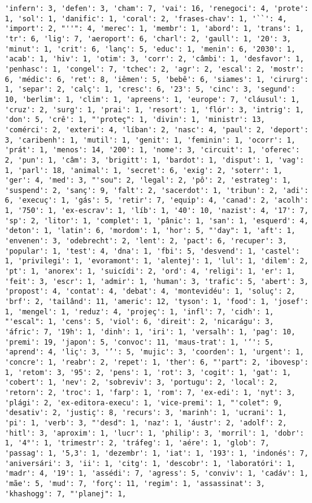\documentclass[11pt]{article}
\begin{document}
\begin{Verbatim}[commandchars=\\\{\}]
'infern': 3, 'defen': 3, 'cham': 7, 'vai': 16, 'renegoci': 4, 'prote': 1, 'sol': 1, 'danific': 1, 'coral': 2, 'frases-chav': 1, '``': 4, 'import': 2, "''": 4, 'merec': 1, 'membr': 1, 'abord': 1, 'trans': 1, 'tr': 6, 'lig': 7, 'aeroport': 6, 'charl': 2, 'gaull': 1, '20': 3, 'minut': 1, 'crit': 6, 'lanç': 5, 'educ': 1, 'menin': 6, '2030': 1, 'acab': 1, 'hiv': 1, 'otim': 3, 'corr': 2, 'câmbi': 1, 'desfavor': 1, 'penhasc': 1, 'congel': 7, 'tchec': 2, 'agr': 2, 'escal': 2, 'mostr': 6, 'médic': 6, 'ret': 8, 'iêmen': 5, 'bebê': 6, 'siames': 1, 'cirurg': 1, 'separ': 2, 'calç': 1, 'cresc': 6, '23': 5, 'cinc': 3, 'segund': 10, 'berlim': 1, 'clim': 1, 'apreens': 1, 'europe': 7, 'cláusul': 1, 'cruz': 2, 'surg': 1, 'prai': 1, 'resort': 1, 'flór': 3, 'intrig': 1, 'don': 5, 'crê': 1, "'proteç": 1, 'divin': 1, 'ministr': 13, 'comérci': 2, 'exteri': 4, 'líban': 2, 'nasc': 4, 'paul': 2, 'deport': 3, 'caribenh': 1, 'mutil': 1, 'genit': 1, 'feminin': 1, 'ocorr': 1, 'prát': 1, 'menos': 14, '200': 1, 'nome': 3, 'circuit': 1, 'oferec': 2, 'pun': 1, 'câm': 3, 'brigitt': 1, 'bardot': 1, 'disput': 1, 'vag': 1, 'parl': 18, 'animal': 1, 'secret': 6, 'exig': 2, 'soterr': 1, 'ger': 4, 'med': 3, "'sou": 2, 'legal': 2, 'pô': 2, 'estrateg': 1, 'suspend': 2, 'sanç': 9, 'falt': 2, 'sacerdot': 1, 'tribun': 2, 'adi': 6, 'execuç': 1, 'gás': 5, 'retir': 7, 'equip': 4, 'canad': 2, 'acolh': 1, '750': 1, 'ex-escrav': 1, 'líb': 1, '40': 10, 'nazist': 4, '17': 7, 'sp': 2, 'litor': 1, 'complet': 1, 'pânic': 1, 'san': 1, 'esquerd': 4, 'deton': 1, 'latin': 6, 'mordom': 1, 'hor': 5, "'day": 1, 'aft': 1, 'envenen': 3, 'odebrecht': 2, 'lent': 2, 'pact': 6, 'recuper': 3, 'popular': 1, 'test': 4, 'dna': 1, 'fbi': 5, 'desvend': 1, 'castel': 1, 'privilegi': 1, 'evoramont': 1, 'alentej': 1, 'lul': 1, 'dilem': 2, 'pt': 1, 'anorex': 1, 'suicídi': 2, 'ord': 4, 'religi': 1, 'er': 1, 'feit': 3, 'escr': 1, 'admir': 1, 'human': 3, 'trafic': 5, 'abert': 3, 'propost': 4, 'contat': 4, 'debat': 4, 'montevidéu': 1, 'soluç': 2, 'brf': 2, 'tailând': 11, 'americ': 12, 'tyson': 1, 'food': 1, 'josef': 1, 'mengel': 1, 'reduz': 4, 'projeç': 1, 'infl': 7, 'cidh': 1, "'escal": 1, 'cens': 5, 'viol': 6, 'direit': 2, 'nicarágu': 3, 'áfric': 7, '19h': 1, 'dinh': 1, 'iri': 1, 'versalh': 1, 'pag': 10, 'premi': 19, 'japon': 5, 'convoc': 11, 'maus-trat': 1, '‘': 5, 'aprend': 4, 'liç': 3, '’': 5, 'mujic': 3, 'coorden': 1, 'urgent': 1, 'concre': 1, 'reabr': 2, 'repet': 1, 'ther': 6, "'part": 2, 'ibovesp': 1, 'retom': 3, '95': 2, 'pens': 1, 'rot': 3, 'cogit': 1, 'gat': 1, 'cobert': 1, 'nev': 2, 'sobreviv': 3, 'portugu': 2, 'local': 2, 'retorn': 2, 'troc': 1, 'farp': 1, 'rom': 7, 'ex-edi': 1, 'nyt': 3, 'plági': 2, 'ex-editora-execu': 1, 'vice-premi': 1, "'colet": 9, 'desativ': 2, 'justiç': 8, 'recurs': 3, 'marinh': 1, 'ucrani': 1, 'pi': 1, 'verb': 3, "'desd": 1, 'naz': 1, 'áustr': 2, 'adolf': 2, 'hitl': 3, 'aproxim': 1, 'lucr': 1, 'philip': 3, 'morril': 1, 'dobr': 1, '4°': 1, 'trimestr': 2, 'tráfeg': 1, 'aére': 1, 'glob': 7, 'passag': 1, '5,3': 1, 'dezembr': 1, 'iat': 1, '193': 1, 'indonés': 7, 'aniversári': 3, 'ii': 1, 'citg': 1, 'descobr': 1, 'laboratóri': 1, 'madr': 4, '19': 1, 'assédi': 7, 'agress': 5, 'conviv': 1, 'cadáv': 1, 'mãe': 5, 'mud': 7, 'forç': 11, 'regim': 1, 'assassinat': 3, 'khashogg': 7, "'planej": 1, 
\end{Verbatim}
\end{document}
